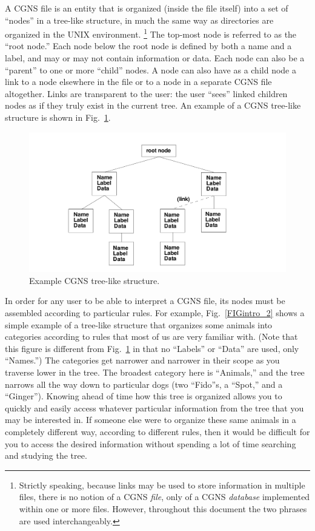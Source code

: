 \documentclass[12pt]{article}
\begin{document}
A CGNS file is an entity that is
organized (inside the file itself) into a set of ``nodes'' in a tree-like
structure, in much the same way as directories are
organized in the UNIX environment.  \footnote{Strictly speaking, because links may be used
to store information in multiple files, there is no notion of a
CGNS {\it file}, only of a CGNS {\it database} implemented within one or
more files.  However, throughout this document the two phrases are
used interchangeably.}
The top-most node is referred to
as the ``root node.''  Each node below the root node
is defined by both a name and a label, and
may or may not contain information or data.  
Each node can also be a ``parent'' to one or more
``child'' nodes.  A node can also have as a child node a link
to a node elsewhere in the file or to a node in a separate
CGNS file altogether.  Links are transparent to the user:
the user ``sees'' linked children nodes as
if they truly exist in the current tree.
An example of a CGNS tree-like structure is shown in 
Fig.~\ref{FIGintro}.

\begin{figure}[hpbt]
\centerline{{\includegraphics[width=150mm]{figures/intro}}}
\caption{Example CGNS tree-like structure.}
\label{FIGintro}
\end{figure}
%

In order for any user to be able to interpret a CGNS file, its
nodes must be assembled according to particular rules.
For example, Fig.~\ref{FIGintro_2} shows a simple example
of a tree-like structure that organizes some animals into
categories according to rules that most of us are very
familiar with.  (Note that this figure is different from 
Fig.~\ref{FIGintro} in that no ``Labels'' or ``Data'' are
used, only ``Names.'')  The categories 
get narrower and narrower in their scope
as you traverse lower in the tree.  The broadest category here
is ``Animals,'' and the tree narrows all the way down to
particular dogs (two ``Fido''s, a ``Spot,'' and a ``Ginger'').
Knowing ahead of time how this tree is organized allows you
to quickly and easily access whatever particular information
from the tree that you may be interested in.
If someone else were to organize these same animals in a completely
different way, according to different rules, then it would be
difficult for you to access the desired information without
spending a lot of time searching and studying the tree.
\end{document}
